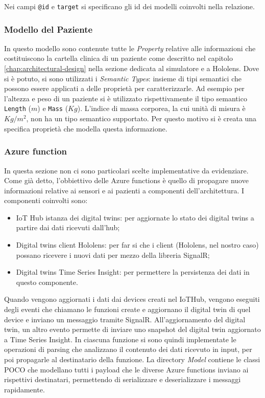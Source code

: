 Nei campi \texttt{@id} e \texttt{target} si specificano gli id dei modelli coinvolti nella relazione.

\subsubsection{Modello del Paziente}
In questo modello sono contenute tutte le \textit{Property} relative alle informazioni che costituiscono la cartella clinica di un paziente come descritto nel capitolo \ref{chap:architectural-design} nella sezione dedicata al simulatore e a Hololens. \newline \newline Dove si è potuto, si sono utilizzati i \textit{Semantic Types}: insieme di tipi semantici che possono essere applicati a delle proprietà per caratterizzarle. Ad esempio per l'altezza e peso di un paziente si è utilizzato rispettivamente il tipo semantico \texttt{Length} (\(m\)) e \texttt{Mass} (\(Kg\)). L'indice di massa corporea, la cui unità di misura è \(Kg/m^2\), non ha un tipo semantico supportato. Per questo motivo si è creata una specifica proprietà che modella questa informazione.

\subsubsection{Azure function}
In questa sezione non ci sono particolari scelte implementative da evidenziare. Come già detto, l'obbiettivo delle Azure functions è quello di propagare nuove informazioni relative ai sensori e ai pazienti a componenti dell'architettura. I componenti coinvolti sono: 

\begin{itemize}
    \item IoT Hub \to \> istanza dei digital twins: per aggiornate lo stato dei digital twins a partire dai dati ricevuti dall'hub;
    
    \item Digital twins \to \> client Hololens: per far si che i client (Hololens, nel nostro caso) possano ricevere i nuovi dati per mezzo della libreria SignalR;
    
    \item Digital twins \to \> Time Series Insight: per permettere la persistenza dei dati in questo componente.
\end{itemize}

Quando vengono aggiornati i dati dai devices creati nel IoTHub, vengono eseguiti degli eventi che chiamano le funzioni create e aggiornano il digital twin di quel device e inviano un messaggio tramite SignalR. All'aggiornamento del digital twin, un altro evento permette di inviare uno snapshot del digital twin aggiornato a Time Series Insight.
In ciascuna funzione si sono quindi implementate le operazioni di parsing che analizzano il contenuto dei dati ricevuto in input, per poi propagarle al destinatario della funzione. \newline \newline La directory \textit{Model} contiene le classi POCO che modellano tutti i payload che le diverse Azure functions inviano ai rispettivi destinatari, permettendo di serializzare e deserializzare i messaggi rapidamente.

